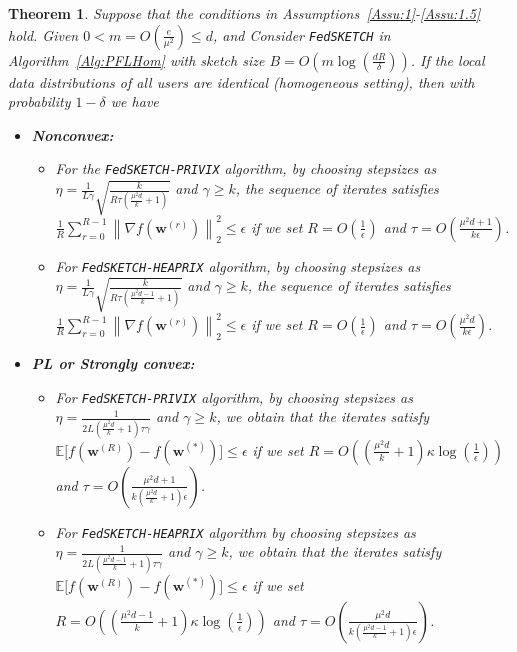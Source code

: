 \documentclass[twoside]{article}
\newtheorem{theorem}{Theorem}
\begin{document}
\begin{theorem}\label{thm:homog_case}
  Suppose that the conditions in Assumptions~\ref{Assu:1}-\ref{Assu:1.5} hold. Given $0<m=O\left(\frac{e}{\mu^2}\right)\leq d$, and Consider \texttt{FedSKETCH} in Algorithm~\ref{Alg:PFLHom} with sketch size $B=O\left(m\log\left(\frac{d R}{\delta}\right)\right)$. If the local data distributions of all users are identical (homogeneous setting), then with probability $1-\delta$ we have  
 \begin{itemize}
     \item \textbf{Nonconvex:}  
     \begin{itemize}
         \item [1)] For the  \texttt{FedSKETCH-PRIVIX} algorithm, by choosing stepsizes as $\eta=\frac{1}{L\gamma}\sqrt{\frac{k}{R\tau\left(\frac{\mu^2d}{k}+1\right)}}$ and $\gamma\geq k$, the sequence of iterates satisfies  $\frac{1}{R}\sum_{r=0}^{R-1}\left\|\nabla f({\boldsymbol{w}}^{(r)})\right\|_2^2\leq {\epsilon}$ if we set
     $R=O\left(\frac{1}{\epsilon}\right)$ and $ \tau=O\left(\frac{\mu^2d+1}{{k}\epsilon}\right)$.
         \item[2)] For \texttt{FedSKETCH-HEAPRIX} algorithm, by choosing stepsizes as $\eta=\frac{1}{L\gamma}\sqrt{\frac{k}{R\tau\left(\frac{\mu^2d-1}{k}+1\right)}}$ and $\gamma\geq k$, the sequence of iterates satisfies  $\frac{1}{R}\sum_{r=0}^{R-1}\left\|\nabla f({\boldsymbol{w}}^{(r)})\right\|_2^2\leq {\epsilon}$ if we set
     $R=O\left(\frac{1}{\epsilon}\right)$ and $ \tau=O\left(\frac{\mu^2d}{{k}\epsilon}\right)$. 
     \end{itemize}
     
     \item \textbf{PL or Strongly convex:}
      \begin{itemize}
          \item[1)] For \texttt{FedSKETCH-PRIVIX} algorithm, by choosing stepsizes as $\eta=\frac{1}{2L\left(\frac{\mu^2d}{k}+1\right)\tau\gamma}$ and $\gamma\geq k$, we obtain that the iterates satisfy $\mathbb{E}\Big[f({\boldsymbol{w}}^{(R)})-f({\boldsymbol{w}}^{(*)})\Big]\leq \epsilon$ if  we set
     $R=O\left(\left(\frac{\mu^2d}{k}+1\right)\kappa\log\left(\frac{1}{\epsilon}\right)\right)$ and $ \tau=O\left(\frac{\mu^2d+1}{k\left(\frac{\mu^2d}{k}+1\right)\epsilon}\right)$.
          
          \item[2)] For \texttt{FedSKETCH-HEAPRIX} algorithm
by choosing stepsizes as $\eta=\frac{1}{2L\left(\frac{\mu^2d-1}{k}+1\right)\tau\gamma}$ and $\gamma\geq k$, we obtain that the iterates satisfy $\mathbb{E}\Big[f({\boldsymbol{w}}^{(R)})-f({\boldsymbol{w}}^{(*)})\Big]\leq \epsilon$ if  we set
     $R=O\left(\left(\frac{\mu^2d-1}{k}+1\right)\kappa\log\left(\frac{1}{\epsilon}\right)\right)$ and $ \tau=O\left(\frac{\mu^2d}{k\left(\frac{\mu^2d-1}{k}+1\right)\epsilon}\right)$. 
      \end{itemize}
      

\end{itemize}
\end{theorem}
\end{document}
